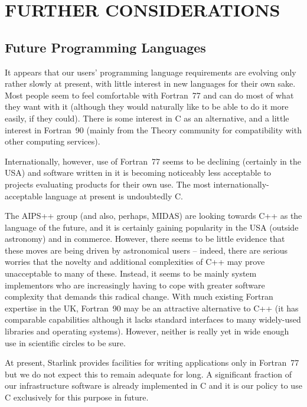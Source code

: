 \documentclass[twoside,11pt]{article}
\newcommand{\htmladdnormallink}[2]{#1}
\newcommand{\aipsurl}[0]{http://info.cv.nrao.edu/aips++/docs/html/aips++.html}
\newcommand{\midasurl}[0]{http://http.hq.eso.org/midas-info/midas.html}
\newcommand{\aipsref}[1]{\htmladdnormallink{#1}{\aipsurl}}
\newcommand{\midasref}[1]{\htmladdnormallink{#1}{\midasurl}}
\begin{document}
\section{FURTHER CONSIDERATIONS}

\subsection{Future Programming Languages}

It appears that our users' programming language requirements are
evolving only rather slowly at present, with little interest in new
languages for their own sake.  Most people seem to feel comfortable
with Fortran~77 and can do most of what they want with it (although
they would naturally like to be able to do it more easily, if they
could). There is some interest in C as an alternative, and a little
interest in Fortran~90 (mainly from the Theory community for
compatibility with other computing services).

Internationally, however, use of Fortran~77 seems to be declining
(certainly in the USA) and software written in it is becoming
noticeably less acceptable to projects evaluating products for their
own use. The most internationally-acceptable language at present is
undoubtedly C.

The \aipsref{AIPS++} group (and also, perhaps, \midasref{MIDAS}) are
looking towards C++ as the language of the future, and it is certainly
gaining popularity in the USA (outside astronomy) and in
commerce. However, there seems to be little evidence that these moves
are being driven by astronomical users -- indeed, there are serious
worries that the novelty and additional complexities of C++ may prove
unacceptable to many of these.  Instead, it seems to be mainly system
implementors who are increasingly having to cope with greater software
complexity that demands this radical change. With much existing
Fortran expertise in the UK, Fortran~90 may be an attractive
alternative to C++ (it has comparable capabilities although it lacks
standard interfaces to many widely-used libraries and operating
systems). However, neither is really yet in wide enough use in
scientific circles to be sure.

At present, Starlink provides facilities for writing applications only
in Fortran~77 but we do not expect this to remain adequate for long.
A significant fraction of our infrastructure software is already
implemented in C and it is our policy to use C exclusively for this
purpose in future.
\end{document}
